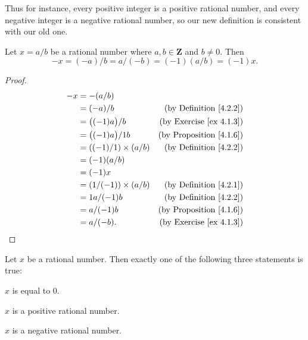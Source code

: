 \begin{note}
    Thus for instance, every positive integer is a positive rational number, and every negative integer is a negative rational number, so our new definition is consistent with our old one.
\end{note}

\begin{additional corollary}\label{ac 4.2.3}
Let \(x = a / b\) be a rational number where \(a, b \in \mathbf{Z}\) and \(b \neq 0\).
Then
\[
    -x = (-a) / b = a / (-b) = (-1)(a / b) = (-1)x.
\]
\end{additional corollary}

\begin{proof}
    \begin{align*}
        -x & = -(a / b)                                                        \\
           & = (-a) / b                  & \text{(by Definition \ref{4.2.2})}  \\
           & = \big((-1)a\big) / b       & \text{(by Exercise \ref{ex 4.1.3})} \\
           & = \big((-1)a\big) / 1b      & \text{(by Proposition \ref{4.1.6})} \\
           & = ((-1) / 1) \times (a / b) & \text{(by Definition \ref{4.2.2})}  \\
           & = (-1)(a / b)                                                     \\
           & = (-1)x                                                           \\
           & = (1 / (-1)) \times (a / b) & \text{(by Definition \ref{4.2.1})}  \\
           & = 1a / (-1)b                & \text{(by Definition \ref{4.2.2})}  \\
           & = a / (-1)b                 & \text{(by Proposition \ref{4.1.6})} \\
           & = a / (-b).                 & \text{(by Exercise \ref{ex 4.1.3})}
    \end{align*}
\end{proof}

\begin{lemma}\label{4.2.7}
    Let \(x\) be a rational number.
    Then exactly one of the following three statements is true:
    \begin{enumerate*}
        \item \(x\) is equal to \(0\).
        \item \(x\) is a positive rational number.
        \item \(x\) is a negative rational number.
    \end{enumerate*}
\end{lemma}

